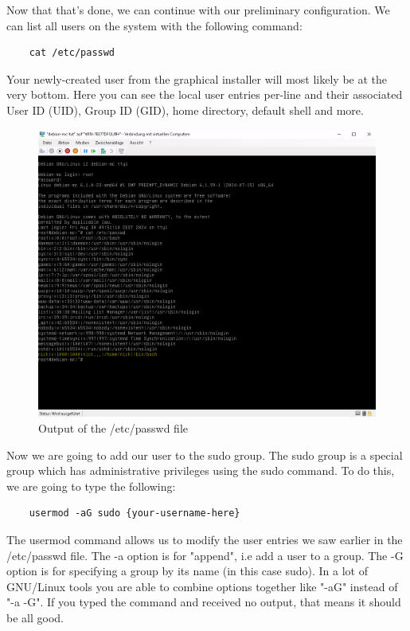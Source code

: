 \documentclass[]{article}
\begin{document}
Now that that's done, we can continue with our preliminary configuration. We can list all users on the system with the following command:

\begin{verbatim}
	cat /etc/passwd
\end{verbatim}

Your newly-created user from the graphical installer will most likely be at the very bottom. Here you can see the local user entries per-line and their associated User ID (UID), Group ID (GID), home directory, default shell and more.

\begin{figure}[h!]
	\caption{Output of the /etc/passwd file}
	\centering
	\includegraphics[width=1\textwidth]{passwd}
\end{figure}
\FloatBarrier

Now we are going to add our user to the sudo group. The sudo group is a special group which has administrative privileges using the sudo command. To do this, we are going to type the following:

\begin{verbatim}
	usermod -aG sudo {your-username-here}
\end{verbatim}

The usermod command allows us to modify the user entries we saw earlier in the /etc/passwd file. The -a option is for "append", i.e add a user to a group. The -G option is for specifying a group by its name (in this case sudo). In a lot of GNU/Linux tools you are able to combine options together like "-aG" instead of "-a -G". If you typed the command and received no output, that means it should be all good.
\end{document}
